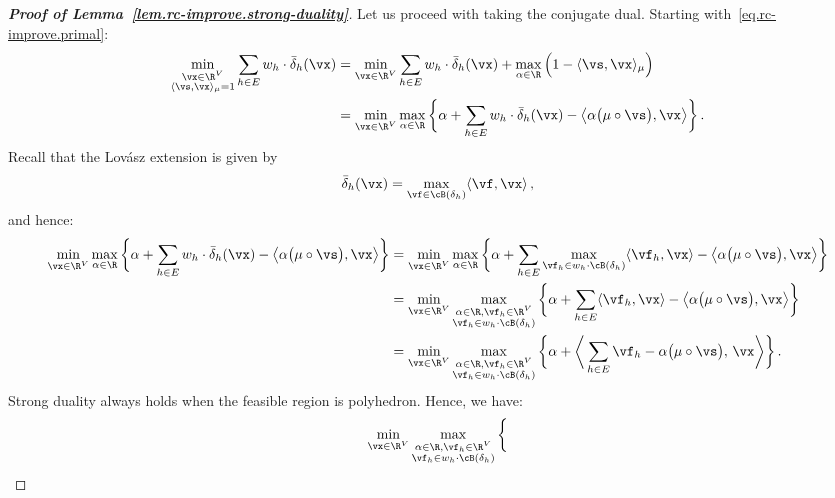 \documentclass[letterpaper]{article}
\begin{document}
\subsection{}
\label{sec.appendix.omitted.ci}
\improveduality*
\begin{proof}[{\bf Proof of Lemma~\ref{lem.rc-improve.strong-duality}}]
Let us proceed with taking the conjugate dual. Starting with~\eqref{eq.rc-improve.primal}:
\begin{align*}
\min_{\substack{\vx \in \R^V \\ \langle \vs, \vx \rangle_{\mu} = 1}} \sum_{h \in E} w_h \cdot \bar{\delta}_h(\vx)
&= \min_{\vx \in \R^V} \sum_{h \in E} w_h \cdot \bar{\delta}_h(\vx) + \max_{\alpha \in \R} \Big( 1 - \langle \vs, \vx \rangle_{\mu} \Big) \\
&= \min_{\vx \in \R^V} \max_{\alpha \in \R} \bigg\{ \alpha + \sum_{h \in E}w_h \cdot \bar{\delta}_h(\vx) - \big\langle \alpha \big( \mu \circ \vs \big), \vx \big\rangle \bigg\} \, .
\end{align*}
Recall that the Lov\'{a}sz extension is given by
\begin{equation*}
\bar{\delta}_h(\vx)
= \max_{\vf \in \cB(\delta_h)} \langle \vf, \vx \rangle \, ,
\end{equation*}
and hence:
\begin{align*}
\min_{\vx \in \R^V} \max_{\alpha \in \R} \bigg\{ \alpha + \sum_{h \in E}w_h \cdot \bar{\delta}_h(\vx) - \big\langle \alpha \big( \mu \circ \vs \big), \vx \big\rangle \bigg\}
&= \min_{\vx \in \R^V} \max_{\alpha \in \R} \bigg\{
  \alpha + \sum_{h \in E} \max_{\vf_h \in w_h\cdot \cB(\delta_h)} \langle \vf_h, \vx \rangle - \big\langle \alpha \big( \mu \circ \vs \big), \vx \big\rangle
\bigg\} \\
&= \min_{\vx \in \R^V} \max_{\substack{\alpha \in \R, \vf_h \in \R^V \\ \vf_h \in w_h\cdot \cB(\delta_h)}} \bigg\{
  \alpha + \sum_{h \in E} \langle \vf_h, \vx \rangle - \big\langle \alpha \big( \mu \circ \vs \big), \vx \big\rangle
\bigg\} \\
&= \min_{\vx \in \R^V} \max_{\substack{\alpha \in \R, \vf_h \in \R^V \\ \vf_h \in w_h\cdot \cB(\delta_h)}} \bigg\{
  \alpha + \bigg\langle \sum_{h \in E} \vf_h - \alpha \big( \mu \circ \vs \big), \, \vx \bigg\rangle
\bigg\} \, .
\end{align*}
Strong duality always holds when the feasible region is polyhedron. Hence, we have:
\begin{equation*}
\min_{\vx \in \R^V} \max_{\substack{\alpha \in \R, \vf_h \in \R^V \\ \vf_h \in w_h\cdot \cB(\delta_h)}} \bigg\{

\end{equation*}
\end{proof}
\end{document}
